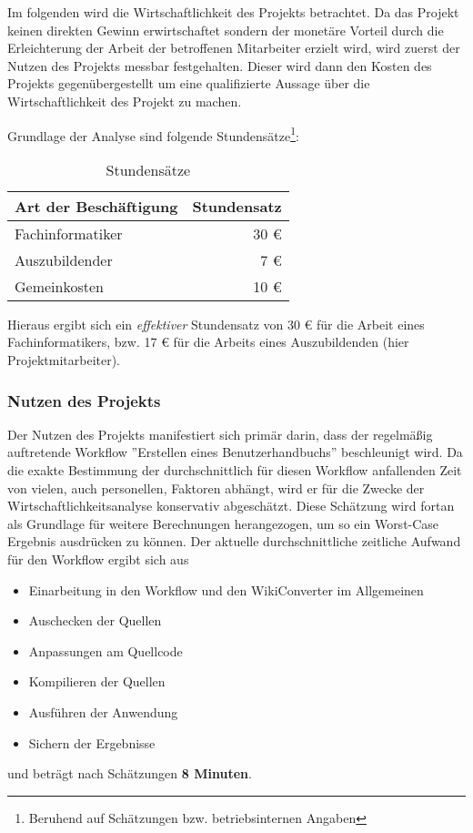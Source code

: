 \documentclass[12pt, xcolor=dvipsnames]{scrartcl}
\begin{document}
Im folgenden wird die Wirtschaftlichkeit des Projekts betrachtet. Da das Projekt keinen direkten Gewinn erwirtschaftet sondern der monetäre Vorteil durch die Erleichterung der Arbeit der betroffenen Mitarbeiter erzielt wird, wird zuerst der Nutzen des Projekts messbar festgehalten. Dieser wird dann den Kosten des Projekts gegenübergestellt um eine qualifizierte Aussage über die Wirtschaftlichkeit des Projekt zu machen.

Grundlage der Analyse sind folgende Stundensätze\footnote{Beruhend auf Schätzungen bzw. betriebsinternen Angaben}:

\begin{table}[H]
	\centering
	\begin{tabular}{lr}

		\rowcolor{white!15}				
		\textbf{Art der Beschäftigung} & \textbf{Stundensatz} \\\hline		
		
		Fachinformatiker & 30 \euro \\
		Auszubildender & 7 \euro \\
		Gemeinkosten & 10 \euro \\
			    
	\end{tabular}
	\caption{Stundensätze}
	\label{tab:stundensätze}
\end{table}

Hieraus ergibt sich ein \textit{effektiver} Stundensatz von 30 \euro{} für die Arbeit eines Fachinformatikers, bzw. 17 \euro{} für die Arbeits eines Auszubildenden (hier Projektmitarbeiter).


\subsubsection{Nutzen des Projekts}
\label{sec:nutzen_des_projekts}

Der Nutzen des Projekts manifestiert sich primär darin, dass der regelmäßig auftretende Workflow ''Erstellen eines Benutzerhandbuchs'' beschleunigt wird.
Da die exakte Bestimmung der durchschnittlich für diesen Workflow anfallenden Zeit von vielen, auch personellen, Faktoren abhängt, wird er für die Zwecke der Wirtschaftlichkeitsanalyse konservativ abgeschätzt. Diese Schätzung wird fortan als Grundlage für weitere Berechnungen herangezogen, um so ein Worst-Case Ergebnis ausdrücken zu können.
Der aktuelle durchschnittliche zeitliche Aufwand für den Workflow ergibt sich aus
\begin{itemize}
	\item Einarbeitung in den Workflow und den WikiConverter im Allgemeinen
	\item Auschecken der Quellen
	\item Anpassungen am Quellcode
	\item Kompilieren der Quellen
	\item Ausführen der Anwendung
	\item Sichern der Ergebnisse
\end{itemize}
und beträgt nach Schätzungen \textbf{8 Minuten}. \\
\end{document}
